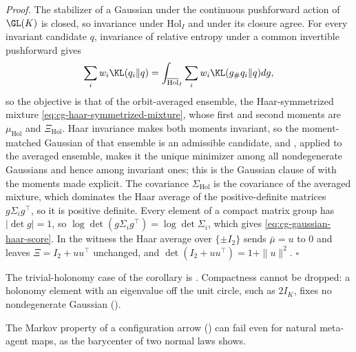 \noindent\emph{Proof.}
The stabilizer of a Gaussian under the continuous pushforward action of
\(\GL(K)\) is closed, so invariance under \(\mathrm{Hol}_I\) and under its
closure agree. For every invariant candidate \(q\), invariance of relative
entropy under a common invertible pushforward gives
\begin{equation}
\sum_i w_i\KL(q_i\Vert q)
=\int_{\overline{\mathrm{Hol}}_I}\sum_i w_i
\KL(g_\#q_i\Vert q)dg,
\label{eq:cg-haar-objective-average}
\end{equation}
so the objective is that of the orbit-averaged ensemble, the Haar-symmetrized
mixture \eqref{eq:cg-haar-symmetrized-mixture}, whose first and second moments
are \(\mu_{\mathrm{Hol}}\) and \(\Xi_{\mathrm{Hol}}\). Haar invariance makes both
moments invariant, so the moment-matched Gaussian of that ensemble is an
admissible candidate, and , applied
to the averaged ensemble, makes it the unique minimizer among all nondegenerate
Gaussians and hence among invariant ones; this is the Gaussian clause of
 with the moments made explicit. The
covariance \(\Sigma_{\mathrm{Hol}}\) is the covariance of the averaged mixture,
which dominates the Haar average of the positive-definite matrices
\(g\Sigma_ig^\top\), so it is positive definite. Every element of a compact
matrix group has \(|\det g|=1\), so
\(\log\det(g\Sigma_ig^\top)=\log\det\Sigma_i\), which gives
\eqref{eq:cg-gaussian-haar-score}. In the witness the Haar average over
\(\{\pm I_2\}\) sends \(\bar\mu=u\) to \(0\) and leaves \(\Xi=I_2+uu^\top\)
unchanged, and \(\det(I_2+uu^\top)=1+\|u\|^2\). \(\square\)

The trivial-holonomy case of the corollary is
. Compactness cannot be dropped: a
holonomy element with an eigenvalue off the unit circle, such as \(2I_K\), fixes
no nondegenerate Gaussian ().

The Markov property of a configuration arrow () can fail
even for natural meta-agent maps, as the barycenter of two normal laws shows.

